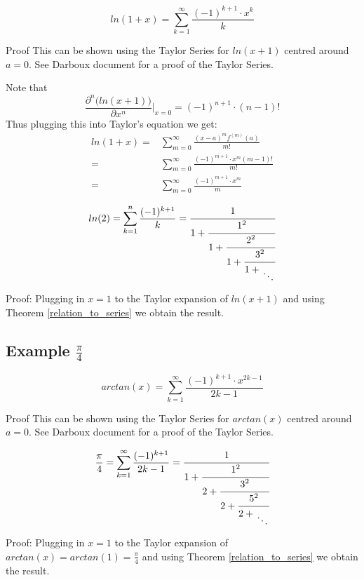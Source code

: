 \documentclass[a4paper]{article}
\begin{document}
\begin{lemma} 
$$
ln(1+x) = \sum_{k=1}^{\infty} \frac{(-1)^{k+1} \cdot x^k}{k}
$$

Proof
This can be shown using the Taylor Series for $ln(x+1)$ centred around $a=0$. See Darboux document for a proof of the Taylor Series.

Note that 
\begin{equation*}
\frac{\partial^n \big(ln(x+1) \big)}{\partial x^n} \rvert_{x=0} = (-1)^{n+1} \cdot (n-1)!
\end{equation*}
Thus plugging this into Taylor's equation we get:
\begin{align*}
ln(1+x) =& \sum_{m=0}^{\infty} \frac{(x-a)^m f^{(m)}(a)}{m!}
\\
=& \sum_{m=0}^{\infty} \frac{(-1)^{m+1} \cdot x^m (m-1)!}{m!}
\\
=& \sum_{m=0}^{\infty} \frac{(-1)^{m+1} \cdot x^m}{m}
\end{align*}
\end{lemma}

\begin{lemma} 
$$
ln(2) = \sum_{k=1}^{n} \frac{(-1)^{k+1}}{k} = \cfrac{1}{1+\cfrac{1^{2}}{1 +\cfrac{2^2}{1 + \cfrac{3^2}{1 + \CFDots}}}} 
$$

Proof:
Plugging in $x=1$ to the Taylor expansion of $ln(x+1)$ and using Theorem \ref{relation_to_series} we obtain the result.
\end{lemma}

\subsection{Example $\frac{\pi}{4}$}
\begin{lemma} 
$$
arctan(x) = \sum_{k=1}^{\infty} \frac{(-1)^{k+1} \cdot x^{2k-1}}{2k-1}
$$

Proof
This can be shown using the Taylor Series for $arctan(x)$ centred around $a=0$. See Darboux document for a proof of the Taylor Series.
\end{lemma}

\begin{lemma} 
$$
\frac{\pi}{4} = \sum_{k=1}^{\infty} \frac{(-1)^{k+1}}{2k-1} = \cfrac{1}{1+\cfrac{1^2}{2 +\cfrac{3^2}{2 + \cfrac{5^2}{2 + \CFDots}}}} 
$$

Proof:
Plugging in $x=1$ to the Taylor expansion of $arctan(x)=arctan(1)=\frac{\pi}{4}$ and using Theorem \ref{relation_to_series} we obtain the result.
\end{lemma}
\end{document}
